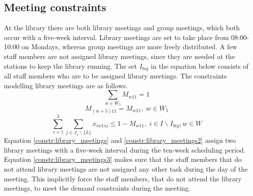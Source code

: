 \subsection{Meeting constraints} \label{section:meeting_constraints}
At the library there are both library meetings and group meetings, which both occur with a five-week interval. Library meetings are set to take place from 08:00-10:00 on Mondays, whereas group meetings are more freely distributed. A few staff members are not assigned library meetings, since they are needed at the stations to keep the library running. The set $I_{big}$ in the equation below consists of all staff members who are to be assigned library meetings. The constraints modelling library meetings are as follows.
\begin{equation} \label{constr:library_meetings}
\sum_{w \in W_5} M_{w11} = 1
\end{equation}
\begin{equation} \label{constr:library_meetings2}
M_{(w+5)11} = M_{w11}, \;   w \in W_5
\end{equation}
\begin{equation} \label{constr:library_meetings3}
\sum_{s=1}^{3} \sum_{j \in J_1 \backslash \{L\}} x_{iw1sj} \leq 1-M_{w11}, \;   i \in I \backslash I_{big}, w \in W
\end{equation}
Equation \ref{constr:library_meetings} and \ref{constr:library_meetings2} assign two library meetings with a five-week interval during the ten-week scheduling period. Equation \ref{constr:library_meetings3} makes sure that the staff members that do not attend library meetings are not assigned any other task during the day of the meeting. This implicitly force the staff members, that do not attend the library meetings, to meet the demand constraints during the meeting. 

